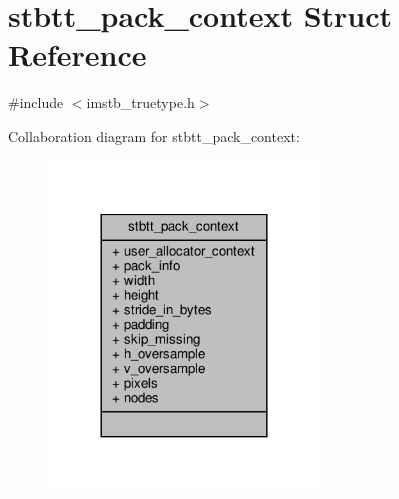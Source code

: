 \hypertarget{structstbtt__pack__context}{}\section{stbtt\+\_\+pack\+\_\+context Struct Reference}
\label{structstbtt__pack__context}


{\ttfamily \#include $<$imstb\+\_\+truetype.\+h$>$}



Collaboration diagram for stbtt\+\_\+pack\+\_\+context\+:
\nopagebreak
\begin{figure}[H]
\begin{center}
\leavevmode
\includegraphics[width=204pt]{structstbtt__pack__context__coll__graph}
\end{center}
\end{figure}

